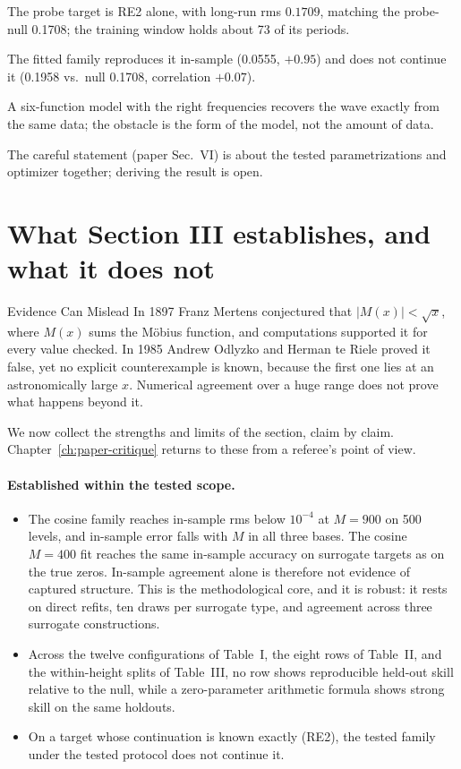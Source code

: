\begin{keyideas}
\item The probe target is RE2 alone, with long-run rms $0.1709$, matching the probe-null 0.1708; the training window holds about 73 of its periods.
\item The fitted family reproduces it in-sample (0.0555, $+0.95$) and does not continue it (0.1958 vs.\ null 0.1708, correlation $+0.07$).
\item A six-function model with the right frequencies recovers the wave exactly from the same data; the obstacle is the form of the model, not the amount of data.
\item The careful statement (paper Sec.~VI) is about the tested parametrizations and optimizer together; deriving the result is open.
\end{keyideas}

\section{What Section III establishes, and what it does not}\label{sec:paper-memorization-limits}
\begin{didyouknow}{Evidence Can Mislead}
In 1897 Franz Mertens conjectured that $|M(x)|<\sqrt{x}$, where $M(x)$ sums the M\"obius function, and computations supported it for every value checked. In 1985 Andrew Odlyzko and Herman te Riele proved it false, yet no explicit counterexample is known, because the first one lies at an astronomically large $x$. Numerical agreement over a huge range does not prove what happens beyond it.
\end{didyouknow}

We now collect the strengths and limits of the section, claim by claim. Chapter~\ref{ch:paper-critique} returns to these from a referee's point of view.

\paragraph{Established within the tested scope.}
\begin{itemize}
\item The cosine family reaches in-sample rms below $10^{-4}$ at $M=900$ on 500 levels, and in-sample error falls with $M$ in all three bases. The cosine $M=400$ fit reaches the same in-sample accuracy on surrogate targets as on the true zeros. In-sample agreement alone is therefore not evidence of captured structure. This is the methodological core, and it is robust: it rests on direct refits, ten draws per surrogate type, and agreement across three surrogate constructions.
\item Across the twelve configurations of Table~I, the eight rows of Table~II, and the within-height splits of Table~III, no row shows reproducible held-out skill relative to the null, while a zero-parameter arithmetic formula shows strong skill on the same holdouts.
\item On a target whose continuation is known exactly (RE2), the tested family under the tested protocol does not continue it.
\end{itemize}

